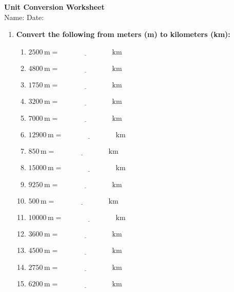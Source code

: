 \documentclass[12pt]{article}
\begin{document}
\begin{center}
    \Large \textbf{Unit Conversion Worksheet} \\
    \normalsize Name: \underline{\hspace{5cm}} \hfill Date: \underline{\hspace{3cm}}
\end{center}
\vspace{10pt}

\begin{enumerate}
    \item \textbf{Convert the following from meters (m) to kilometers (km):}
    \begin{multicols}{2}
    \begin{enumerate}
        \item \(2500 \, \text{m} = \underline{\hspace{3cm}} \, \text{km}\)
        \item \(4800 \, \text{m} = \underline{\hspace{3cm}} \, \text{km}\)
        \item \(1750 \, \text{m} = \underline{\hspace{3cm}} \, \text{km}\)
        \item \(3200 \, \text{m} = \underline{\hspace{3cm}} \, \text{km}\)
        \item \(7000 \, \text{m} = \underline{\hspace{3cm}} \, \text{km}\)
        \item \(12900 \, \text{m} = \underline{\hspace{3cm}} \, \text{km}\)
        \item \(850 \, \text{m} = \underline{\hspace{3cm}} \, \text{km}\)
        \item \(15000 \, \text{m} = \underline{\hspace{3cm}} \, \text{km}\)
        \item \(9250 \, \text{m} = \underline{\hspace{3cm}} \, \text{km}\)
        \item \(500 \, \text{m} = \underline{\hspace{3cm}} \, \text{km}\)
        \item \(10000 \, \text{m} = \underline{\hspace{3cm}} \, \text{km}\)
        \item \(3600 \, \text{m} = \underline{\hspace{3cm}} \, \text{km}\)
        \item \(4500 \, \text{m} = \underline{\hspace{3cm}} \, \text{km}\)
        \item \(2750 \, \text{m} = \underline{\hspace{3cm}} \, \text{km}\)
        \item \(6200 \, \text{m} = \underline{\hspace{3cm}} \, \text{km}\)
    \end{enumerate}
    \end{multicols}


\end{enumerate}
\end{document}
